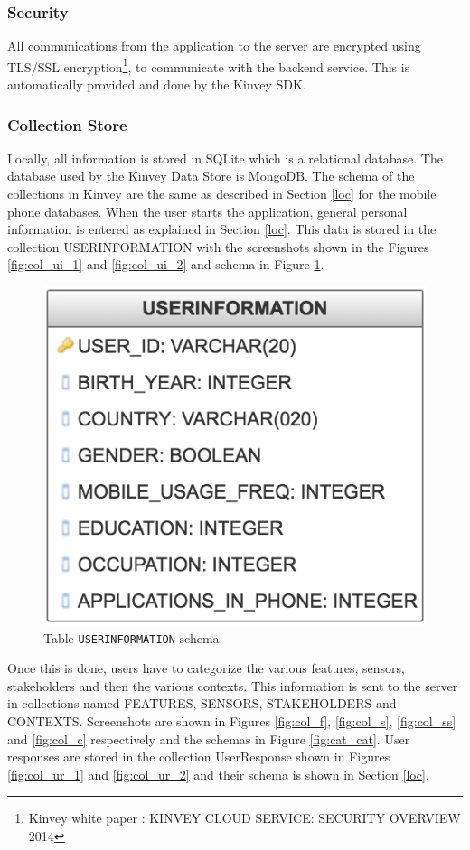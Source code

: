 \subsubsection{Security}

All communications from the application to the server are encrypted using TLS/SSL encryption\footnote{Kinvey white paper : KINVEY CLOUD
SERVICE: SECURITY
OVERVIEW 2014}, to communicate with the backend service. This is automatically provided and done by the Kinvey SDK.

\subsubsection{Collection Store}

Locally, all information is stored in SQLite which is a relational database. The database used by the Kinvey Data Store is MongoDB. The schema of the collections in Kinvey are the same as described in Section \ref{loc} for the mobile phone databases.
When the user starts the application, general personal information is entered as explained in Section \ref{loc}. This data is stored in the
collection USERINFORMATION with the screenshots shown in the Figures \ref{fig:col_ui_1} and \ref{fig:col_ui_2} and schema in Figure \ref{fig:cat_cat_cat}.

\begin{figure}[ht!]
\centering
\includegraphics[width=0.4\linewidth]{./images/schema_ui}
\caption{Table \texttt{USERINFORMATION} schema}
\label{fig:cat_cat_cat}
\end{figure}

Once this is done, users have to categorize the various features, sensors, stakeholders and then the various contexts. This information is sent to the server in collections named FEATURES, SENSORS, STAKEHOLDERS and CONTEXTS. Screenshots are shown in Figures \ref{fig:col_f}, \ref{fig:col_s}, \ref{fig:col_ss} and \ref{fig:col_c} respectively and the schemas in Figure \ref{fig:cat_cat}. User responses are stored in the collection UserResponse shown in Figures \ref{fig:col_ur_1} and \ref{fig:col_ur_2} and their schema is shown in Section \ref{loc}.

